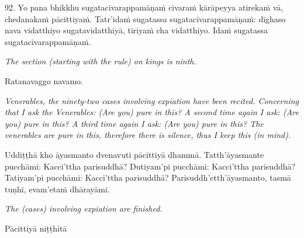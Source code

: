\documentclass[11pt]{article}
\begin{document}
\begin{paracol}{2}
\begin{column}
\begin{flushleft}
92. Yo pana bhikkhu sugatacīvarappamāṇaṁ cīvaraṁ kārāpeyya atirekaṁ vā, chedanakaṁ pācittiyaṁ. Tatr’idaṁ sugatassa sugatacīvarappamāṇaṁ: dīghaso nava vidatthiyo sugatavidatthiyā, tiriyaṁ cha vidatthiyo. Idaṁ sugatassa sugatacīvarappamāṇaṁ.
\switchcolumn*
\end{flushleft}

{\itshape\footnotesize
The section (starting with the rule) on kings is ninth.
}
\switchcolumn

\begin{flushleft}
Ratanavaggo navamo.
\switchcolumn*
\end{flushleft}

{\itshape\footnotesize
Venerables, the ninety-two cases involving expiation have been recited.\newline
Concerning that I ask the Venerables: (Are you) pure in this?\newline
A second time again I ask: (Are you) pure in this?\newline
A third time again I ask: (Are you) pure in this?\newline
The venerables are pure in this, therefore there is silence, thus I keep this (in mind).
}
\switchcolumn

\begin{flushleft}
Uddiṭṭhā kho āyasmanto dvenavuti pācittiyā dhammā.\newline
Tatth’āyasmante pucchāmi: Kacci’ttha parisuddhā?\newline
Dutiyam’pi pucchāmi: Kacci’ttha parisuddhā?\newline
Tatiyam’pi pucchāmi: Kacci’ttha parisuddhā?\newline
Parisuddh’etth’āyasmanto, tasmā tuṇhī, evam’etaṁ dhārayāmi.
\switchcolumn*
\end{flushleft}

{\itshape\footnotesize
The (cases) involving expiation are finished.
}
\switchcolumn

\begin{flushleft}
Pācittiyā niṭṭhitā
\switchcolumn*
\end{flushleft}


\end{column}
\end{paracol}
\end{document}
